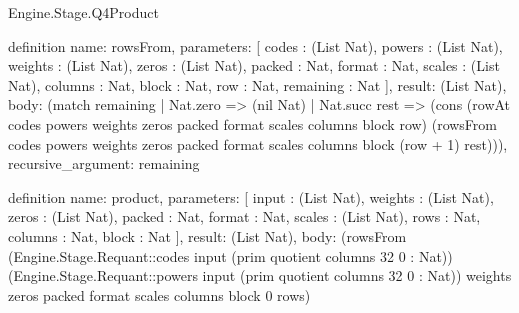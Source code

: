 \begin{lexlean}{Engine.Stage.Q4Product}
\begin{semanticmodule}
definition{
  name: rowsFrom,
  parameters: [
    codes : (List Nat),
    powers : (List Nat),
    weights : (List Nat),
    zeros : (List Nat),
    packed : Nat,
    format : Nat,
    scales : (List Nat),
    columns : Nat,
    block : Nat,
    row : Nat,
    remaining : Nat
  ],
  result: (List Nat),
  body: (match remaining
    | Nat.zero => (nil Nat)
    | Nat.succ rest => (cons (rowAt codes powers weights zeros packed format scales columns block row) (rowsFrom codes powers weights zeros packed format scales columns block (row + 1) rest))),
  recursive_argument: remaining
}

definition{
  name: product,
  parameters: [
    input : (List Nat),
    weights : (List Nat),
    zeros : (List Nat),
    packed : Nat,
    format : Nat,
    scales : (List Nat),
    rows : Nat,
    columns : Nat,
    block : Nat
  ],
  result: (List Nat),
  body: (rowsFrom (Engine.Stage.Requant::codes input (prim quotient columns 32 0 : Nat)) (Engine.Stage.Requant::powers input (prim quotient columns 32 0 : Nat)) weights zeros packed format scales columns block 0 rows)
}
\end{semanticmodule}
\end{lexlean}
